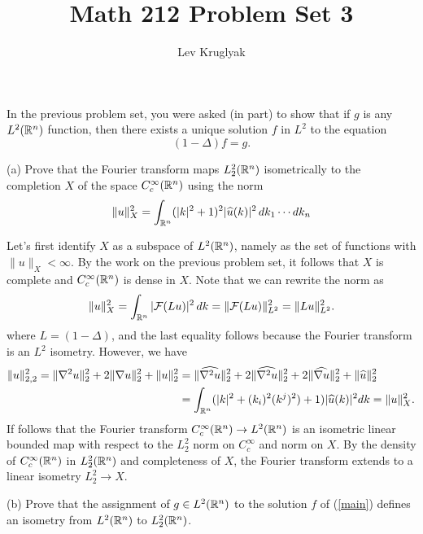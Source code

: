 \documentclass{lkx_pset}
\title{Math 212 Problem Set 3}
\author{Lev Kruglyak}
\begin{document}
\maketitle

\begin{problem}{1}
In the previous problem set, you were asked (in part) to show that if $g$ is any $L^2(\mathbb{R}^n)$ function, then there exists a unique solution $f$ in $L^2$ to the equation
\begin{equation}\label{main}
	(1-\Delta)f = g.
\end{equation}
\end{problem}
\begin{parts}
	\begin{part}{(a)}
		Prove that the Fourier transform maps $L^2_2(\mathbb{R}^n)$ isometrically to the completion $X$ of the space $C^\infty_c(\mathbb{R}^n)$ using the norm
		\[
			\|u\|^2_X = \int_{\mathbb{R}^n} (|k|^2 + 1)^2|\widehat{u}(k)|^2\,dk_1\cdots dk_n
		\]
	\end{part}
	Let's first identify $X$ as a subspace of $L^2(\mathbb{R}^n)$, namely as the set of functions with $\|u\|_X<\infty$. By the work on the previous problem set, it follows that $X$ is complete and $C^\infty_c(\mathbb{R}^n)$ is dense in $X$. Note that we can rewrite the norm as
	\[
		\|u\|^2_X = \int_{\mathbb{R}^n} |\mathcal{F}(Lu)|^2 \,dk = \|\mathcal{F}(Lu)\|^2_{L^2} = \|Lu\|^2_{L^2}.
	\]
	where $L=(1-\Delta)$, and the last equality follows because the Fourier transform is an $L^2$ isometry. However, we have
	\[
		\begin{aligned}
			\|u\|^2_{2,2} = \|\nabla^2 u\|^2_2 + 2\|\nabla u\|^2_2 + \|u\|^2_2
			 & = \|\widehat{\nabla^2 u}\|_2^2 + 2\|\widehat{\nabla^2 u}\|^2_2 + 2\|\widehat{\nabla u}\|^2_2 + \|\widehat{u}\|^2_2 \\
			 & = \int_{\mathbb{R}^n}(|k|^2 + (k_i)^2(k^j)^2) + 1)|\widehat{u}(k)|^2 dk= \|u\|^2_X.
		\end{aligned}
	\]
	If follows that the Fourier transform $C_c^\infty(\mathbb{R}^n) \to L^2(\mathbb{R}^n)$ is an isometric linear bounded map with respect to the $L^2_2$ norm on $C_c^\infty$ and norm on $X$. By the density of $C_c^\infty(\mathbb{R}^n)$ in $L^2_2(\mathbb{R}^n)$ and completeness of $X$, the Fourier transform extends to a linear isometry $L^2_2 \to X$.

	\begin{part}{(b)}
		Prove that the assignment of $g\in L^2(\mathbb{R}^n)$ to the solution $f$ of (\ref{main}) defines an isometry from $L^2(\mathbb{R}^n)$ to $L^2_2(\mathbb{R}^n)$.
	\end{part}


\end{parts}
\end{document}
